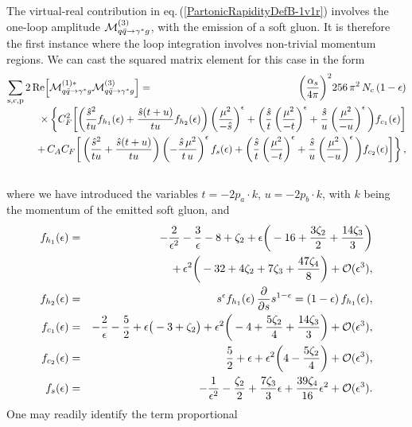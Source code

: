 \documentclass[11pt]{article}
\newcommand{\bea}{\begin{eqnarray}}
\newcommand{\eea}{\end{eqnarray}}
\newcommand{\nn}{\nonumber}
\newcommand{\ord}{{\cal O}}
\newcommand{\as}{\alpha_s}
\newcommand{\eps}{\epsilon}
\newcommand\eqn[1]     {eq.\,(\ref{#1})}
\begin{document}
The virtual-real contribution in 
\eqn{PartonicRapidityDefB-1v1r}
involves the one-loop amplitude 
${\cal M}_{q\bar q \to \gamma^*g}^{(3)}$, 
with the emission of a soft gluon. It is therefore the first instance where the loop 
integration involves non-trivial momentum
regions. We can cast the squared matrix 
element for this case in the form
\bea\label{Msq1r1v} 
\sum_{\rm s,c,p}
2\,{\rm Re}\Big[{\cal M}_{q\bar q \to \gamma^*g}^{(1)*}
{\cal M}_{q\bar q \to \gamma^*g}^{(3)}\Big]
&=& \bigg( \frac{\as}{4\pi}\bigg)^2 
256 \, \pi^2\, N_c\, (1-\eps)\nn \\[-0.1cm] 
&&\hspace{-4.8cm}\times\, \bigg\{
C_F^2 \bigg[ \bigg( \frac{\hat s^2}{t u} f_{h_1}(\eps)
+\frac{\hat s(t+u)}{t u} f_{h_2}(\eps) \bigg)
\left(\frac{\mu^2}{-\hat s}\right)^{\eps}  
+ \bigg( \frac{\hat s}{t} \left(\frac{\mu^2}{-t}\right)^{\eps}
+\frac{\hat s}{u} \left(\frac{\mu^2}{-u}\right)^{\eps} \bigg) 
f_{c_1}(\eps)\bigg] \nn \\ 
&&\hspace{-4.2cm}+\,C_A C_F \bigg[ 
\left( \frac{\hat s^2}{t u} +\frac{\hat s(t+u)}{t u} \right) 
\left(-\frac{\hat s\, \mu^2}{t\,u}\right)^{\eps} f_{s}(\eps)
+ \bigg( \frac{\hat s}{t} \left(\frac{\mu^2}{-t}\right)^{\eps}
+\frac{\hat s}{u} \left(\frac{\mu^2}{-u}\right)^{\eps} \bigg) 
f_{c_2}(\eps)\bigg]  \bigg\}\,,\nn\\
\phantom{}
\eea
where we have introduced the variables 
$t = -2 p_a \cdot k$, $u = -2 p_b \cdot k$,
with $k$ being the momentum of the emitted 
soft gluon, and 
\bea\label{loopfunctions} \nn
f_{h_1}(\eps) &=& - \frac{2}{\eps^2} - \frac{3}{\eps} -8 
+ \zeta_2 + \eps \bigg(-16 + \frac{3 \zeta_2}{2} 
+ \frac{14 \zeta_3}{3} \bigg) \\ \nn
&& +\, \eps^2 \bigg(-32 + 4 \zeta_2 + 7 \zeta_3 
+ \frac{47 \zeta_4}{8} \bigg) + {\cal O}(\eps^3), \\ \nn
f_{h_2}(\eps) &=& s^{\eps} f_{h_1}(\eps)\, \frac{\partial }{\partial s} s^{1-\eps} 
= (1-\eps)\, f_{h_1}(\eps), \\ \nn
f_{c_1}(\eps) &=& 
 - \frac{2}{\eps}-\frac{5}{2} 
+ \eps \big(-3 + \zeta_2\big) 
+ \eps^2 \bigg(-4 + \frac{5 \zeta_2}{4} + \frac{14 \zeta_3}{3} \bigg) 
+\ord(\eps^3), \\ \nn
f_{c_2}(\eps) &=& \frac{5}{2} + \eps 
+ \eps^2 \bigg(4 - \frac{5 \zeta_2}{4}\bigg) +\ord(\eps^3), \\ 
f_{s}(\eps) &=& -\frac{1}{\eps^2} - \frac{\zeta_2}{2} 
+ \frac{7\zeta_3}{3} \eps 
+ \frac{39\zeta_4}{16} \eps^2 +\ord(\eps^3).
\eea
One may readily identify the term proportional 
\end{document}
